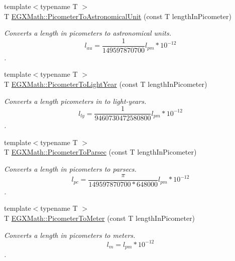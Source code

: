 \begin{DoxyCompactItemize}
\item 
{\footnotesize template$<$typename T $>$ }\\T \mbox{\hyperlink{group___e_g_x_math-_conversions-_length_conversions-_s_i-_picometer-_astronomical_gae051f7eb0eb85b99c614183acc6b8ea6}{E\+G\+X\+Math\+::\+Picometer\+To\+Astronomical\+Unit}} (const T length\+In\+Picometer)
\begin{DoxyCompactList}\small\item\em Converts a length in picometers to astronomical units. \[ l_{au}= \frac{1}{149597870700} l_{pm} * 10^{-12} \]. \end{DoxyCompactList}\item 
{\footnotesize template$<$typename T $>$ }\\T \mbox{\hyperlink{group___e_g_x_math-_conversions-_length_conversions-_s_i-_picometer-_astronomical_ga4d8abbec265ae9e35ac109356db5b89a}{E\+G\+X\+Math\+::\+Picometer\+To\+Light\+Year}} (const T length\+In\+Picometer)
\begin{DoxyCompactList}\small\item\em Converts a length picometers in to light-\/years. \[ l_{ly}= \frac{1}{9460730472580800} l_{pm} * 10^{-12} \]. \end{DoxyCompactList}\item 
{\footnotesize template$<$typename T $>$ }\\T \mbox{\hyperlink{group___e_g_x_math-_conversions-_length_conversions-_s_i-_picometer-_astronomical_ga3248f6de04d23f6568866a8cd80188b6}{E\+G\+X\+Math\+::\+Picometer\+To\+Parsec}} (const T length\+In\+Picometer)
\begin{DoxyCompactList}\small\item\em Converts a length in picometers to parsecs. \[ l_{pc}=\frac{\pi}{149597870700 * 648000} l_{pm} * 10^{-12} \]. \end{DoxyCompactList}\item 
{\footnotesize template$<$typename T $>$ }\\T \mbox{\hyperlink{group___e_g_x_math-_conversions-_length_conversions-_s_i-_picometer-_s_i_gab975f2eb902fcbb745ee4edbbf611f69}{E\+G\+X\+Math\+::\+Picometer\+To\+Meter}} (const T length\+In\+Picometer)
\begin{DoxyCompactList}\small\item\em Converts a length in picometers to meters. \[ l_{m}=l_{pm} * 10^{-12} \]. \end{DoxyCompactList}\item 

\end{DoxyCompactItemize}
